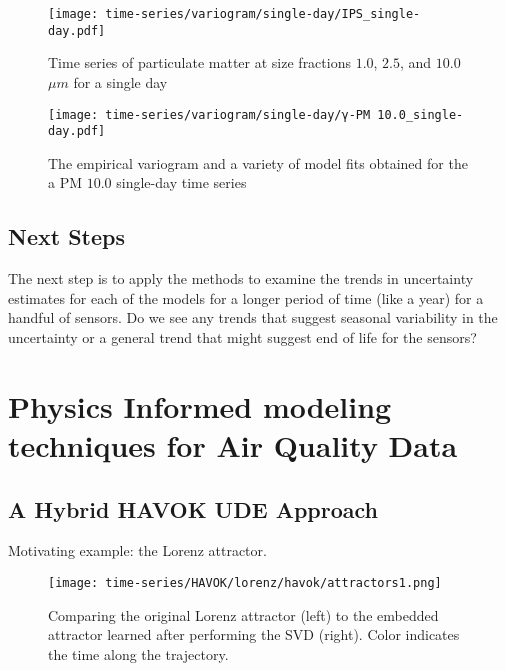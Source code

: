 \begin{figure}[h]
  \centering
  \texttt{[image: time-series/variogram/single-day/IPS\_single-day.pdf]}
  \caption{Time series of particulate matter at size fractions $1.0$, $2.5$, and $10.0$ $\mu m$ for a single day}
  \label{fig:pm-single-day}
\end{figure}


\begin{figure}[h]
  \centering
  \texttt{[image: time-series/variogram/single-day/γ-PM 10.0\_single-day.pdf]}
  \caption{The empirical variogram and a variety of model fits obtained for the a PM $10.0$ single-day time series}
  \label{fig:pm10-variogram-fits}
\end{figure}

\subsection{Next Steps}

The next step is to apply the methods to examine the trends in uncertainty estimates for each of the models for a longer period of time (like a year) for a handful of sensors. Do we see any trends that suggest seasonal variability in the uncertainty or a general trend that might suggest end of life for the sensors? 



\section{Physics Informed modeling techniques for Air Quality Data}
\subsection{A Hybrid HAVOK UDE Approach}

Motivating example: the Lorenz attractor.

\begin{figure}[h]
  \centering
  \texttt{[image: time-series/HAVOK/lorenz/havok/attractors1.png]}
  \caption{Comparing the original Lorenz attractor (left) to the embedded attractor learned after performing the SVD (right). Color indicates the time along the trajectory.}
\end{figure}

